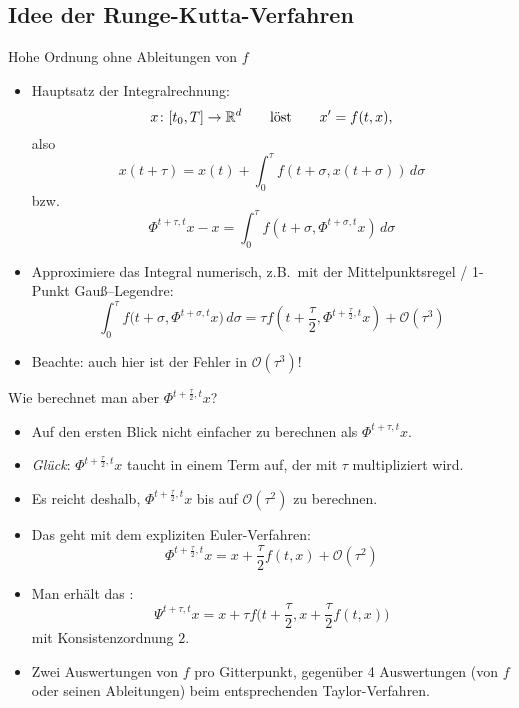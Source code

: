 \subsection{Idee der Runge-Kutta-Verfahren}

\begin{aim}
	 Hohe Ordnung ohne Ableitungen von $f$
\end{aim}
\begin{idea}
	\begin{itemize}
		\item Hauptsatz der Integralrechnung:
		\begin{equation*}
			x \colon [t_0,T] \to \mathbb R^d \qquad \text{löst} \qquad x' =f(t,x),
		\end{equation*}
		also
		\begin{equation*}
			x(t+\tau) = x(t)+\int_0^\tau f (t+\sigma,x (t+\sigma) )\,d\sigma
		\end{equation*}
		bzw.
		\begin{equation*}
			\Phi^{t+\tau,t} x-x = \int_0^\tau f (t+\sigma, \Phi^{t+\sigma,t} x )\,d\sigma
		\end{equation*}
		
		\item Approximiere das Integral numerisch, z.B.\ mit der Mittelpunktsregel / 1-Punkt Gauß--Legendre:
		\begin{equation*}
			\int_0^{\tau} f \big(t+\sigma, \Phi^{t+\sigma,t} x \big)\,d\sigma
			=
			\tau f (t+\frac{\tau}{2},\Phi^{t+\frac{\tau}{2},t} x )+\mathcal{O} (\tau^3)
		\end{equation*}
		\item Beachte: auch hier ist der Fehler in $\mathcal{O}(\tau^3)$!
	\end{itemize}
\end{idea}

Wie berechnet man aber $\Phi^{t+\frac{\tau}{2},t} x$?
\begin{itemize}
	\item Auf den ersten Blick nicht einfacher zu berechnen als $\Phi^{t+\tau,t}x$.
	\item \emph{Glück}: $\Phi^{t+\frac{\tau}{2},t} x$ taucht in einem Term auf, der mit $\tau$
	multipliziert wird.
	\item Es reicht deshalb, $\Phi^{t+\frac{\tau}{2},t} x$ bis auf $\mathcal{O}(\tau^2)$
	zu berechnen.
	\item Das geht mit dem expliziten Euler-Verfahren:
	\begin{equation*}
		\Phi^{t+\frac{\tau}{2},t} x=x+\frac{\tau}{2} f(t,x)+\mathcal{O} (\tau^2)
	\end{equation*}
	\item Man erhält das :
	\begin{equation*}
		\Psi^{t+\tau,t} x = x+\tau f \Big(t+\frac{\tau}{2},x+\frac{\tau}{2} f(t,x) \Big)
	\end{equation*}
	mit Konsistenzordnung $2$.
	\item Zwei Auswertungen von $f$ pro Gitterpunkt, gegenüber 4 Auswertungen (von $f$ oder seinen Ableitungen) beim entsprechenden Taylor-Verfahren.
\end{itemize}

